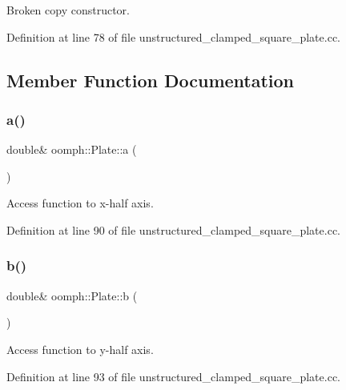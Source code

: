 Broken copy constructor. 



Definition at line 78 of file unstructured\+\_\+clamped\+\_\+square\+\_\+plate.\+cc.



\subsection{Member Function Documentation}
\mbox{\label{classoomph_1_1Plate_a5bf44a99e0504b4c1185656d6b1b9740}} 
\subsubsection{\texorpdfstring{a()}{a()}}
{\footnotesize\ttfamily double\& oomph\+::\+Plate\+::a (\begin{DoxyParamCaption}{ }\end{DoxyParamCaption})\hspace{0.3cm}{\ttfamily [inline]}}



Access function to x-\/half axis. 



Definition at line 90 of file unstructured\+\_\+clamped\+\_\+square\+\_\+plate.\+cc.

\mbox{\label{classoomph_1_1Plate_a24a8bd078b3b675c97203ba6cfa6119b}} 
\subsubsection{\texorpdfstring{b()}{b()}}
{\footnotesize\ttfamily double\& oomph\+::\+Plate\+::b (\begin{DoxyParamCaption}{ }\end{DoxyParamCaption})\hspace{0.3cm}{\ttfamily [inline]}}



Access function to y-\/half axis. 



Definition at line 93 of file unstructured\+\_\+clamped\+\_\+square\+\_\+plate.\+cc.

\mbox{\label{classoomph_1_1Plate_ac44838098ef36d9400c534252579d6e4}} 
